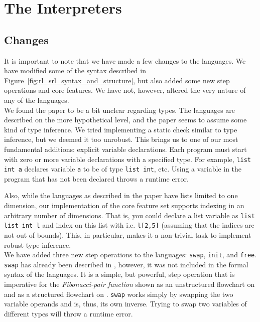 
\section{The Interpreters}

\subsection{Changes}\label{sec:changes}

It is important to note that we have made a few changes to the languages. We have modified some of the syntax described in Figure~\ref{fig:rl_srl_syntax_and_structure}, but also added some new step operations and core features. We have not, however, altered the very nature of any of the languages.\\

\noindent We found the paper\cite{REV} to be a bit unclear regarding types. The languages are described on the more hypothetical level, and the paper seems to assume some kind of type inference. We tried implementing a static check similar to type inference, but we deemed it too unrobust. This brings us to one of our most fundamental additions: explicit variable declarations. Each program must start with zero or more variable declarations with a specified type. For example, \texttt{list int a} declares variable \texttt{a} to be of type \texttt{list int}, etc. Using a variable in the program that has not been declared throws a runtime error.

Also, while the languages as described in the paper have lists limited to one dimension, our implementation of the core feature set supports indexing in an arbitrary number of dimensions. That is, you could declare a list variable as \texttt{list list int l} and index on this list with i.e. \texttt{l[2,5]} (assuming that the indices are not out of bounds). This, in particular, makes it a non-trivial task to implement robust type inference.\\


\noindent We have added three new step operations to the languages: \texttt{swap}, \texttt{init}, and \texttt{free}. \texttt{swap} has already been described in \cite[p.~99]{REV}, however, it was not included in the formal syntax of the languages. It is a simple, but powerful, step operation that is imperative for the \textit{Fibonacci-pair function} shown as an unstructured flowchart on \cite[p.~99]{REV} and as a structured flowchart on \cite[p.~93]{REV}. \texttt{swap} works simply by swapping the two variable operands and is, thus, its own inverse. Trying to swap two variables of different types will throw a runtime error.

